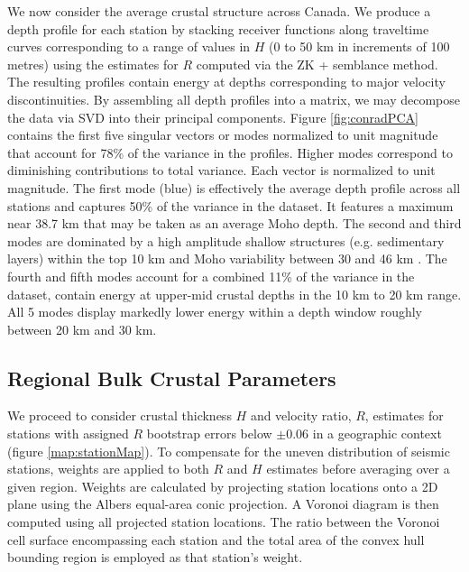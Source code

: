 \documentclass[draft, 12pt]{article}
\begin{document}
We now consider the average crustal structure across Canada. We produce a depth profile for each station by stacking receiver functions along traveltime curves corresponding to a range of values in $H$ (0 to 50 km in increments of 100 metres) using the estimates for $R$ computed via the ZK + semblance method. The resulting profiles contain energy at depths corresponding to major velocity discontinuities. By assembling all depth profiles into a matrix, we may decompose the data via SVD into their principal components. Figure \ref{fig:conradPCA} contains the first five singular vectors or modes normalized to unit magnitude that account for 78\% of the variance in the profiles. Higher modes correspond to diminishing contributions to total variance. Each vector is normalized to unit magnitude. The first mode (blue) is effectively the average depth profile across all stations and captures 50\% of the variance in the dataset. It features a maximum near 38.7 km that may be taken as an average Moho depth. The second and third modes are dominated by a high amplitude shallow structures (e.g. sedimentary layers) within the top 10 km and Moho variability between 30 and 46 km . The fourth and fifth modes account for a combined 11\% of the variance in the dataset, contain energy at upper-mid crustal depths in the 10 km to 20 km range. All 5 modes display markedly lower energy within a depth window roughly between 20 km and 30 km.

\subsection{Regional Bulk Crustal Parameters}

We proceed to consider crustal thickness $H$ and velocity ratio, $R$, estimates for stations with assigned $R$ bootstrap errors below $\pm 0.06$ in a geographic context (figure \ref{map:stationMap}). To compensate for the uneven distribution of seismic stations, weights are applied to both $R$ and $H$ estimates before averaging over a given region. Weights are calculated by projecting station locations onto a 2D plane using the Albers equal-area conic projection. A Voronoi diagram is then computed using all projected station locations. The ratio between the Voronoi cell surface encompassing each station and the total area of the convex hull bounding region is employed as that station's weight.
\end{document}
